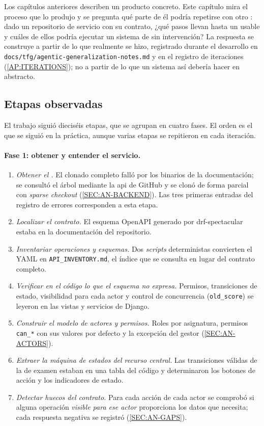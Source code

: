 Los capítulos anteriores describen un producto concreto. Este capítulo mira el proceso que lo
produjo y se pregunta qué parte de él podría repetirse con otro : dado un
repositorio de servicio con su contrato, ¿qué pasos llevan hasta un  usable y
cuáles de ellos podría ejecutar un sistema de  sin intervención? La respuesta
se construye a partir de lo que realmente se hizo, registrado durante el desarrollo en
\texttt{docs/tfg/agentic-generalization-notes.md} y en el registro de iteraciones
(\cref{AP:ITERATIONS}); no a partir de lo que un sistema así debería hacer en abstracto.

\subsection{Etapas observadas}

El trabajo siguió dieciséis etapas, que se agrupan en cuatro fases. El orden es el que se
siguió en la práctica, aunque varias etapas se repitieron en cada iteración.

\paragraph{Fase 1: obtener y entender el servicio.}
\begin{enumerate}
  \item \emph{Obtener el .} El clonado completo falló por los binarios de la
        documentación; se consultó el árbol mediante la \acs{api} de GitHub y se clonó de
        forma parcial con \textit{sparse checkout} (\cref{SEC:AN-BACKEND}). Las tres primeras
        entradas del registro de errores corresponden a esta etapa.
  \item \emph{Localizar el contrato.} El esquema OpenAPI generado por drf-spectacular estaba
        en la documentación del repositorio.
  \item \emph{Inventariar operaciones y esquemas.} Dos \textit{scripts} deterministas
        convierten el YAML en \texttt{API\_INVENTORY.md}, el índice que se consulta en lugar
        del contrato completo.
  \item \emph{Verificar en el código lo que el esquema no expresa.} Permisos, transiciones
        de estado, visibilidad para cada actor y control de concurrencia
        (\texttt{old\_score}) se leyeron en las vistas y servicios de Django.
  \item \emph{Construir el modelo de actores y permisos.} Roles por asignatura, permisos
        \texttt{can\_*} con sus valores por defecto y la excepción del gestor
        (\cref{SEC:AN-ACTORS}).
  \item \emph{Extraer la máquina de estados del recurso central.} Las transiciones válidas de
        la  de examen estaban en una tabla del código y determinaron los
        botones de acción y los indicadores de estado.
  \item \emph{Detectar huecos del contrato.} Para cada acción de cada actor se comprobó si
        alguna operación \emph{visible para ese actor} proporciona los datos que necesita;
        cada respuesta negativa se registró (\cref{SEC:AN-GAPS}).
\end{enumerate}

